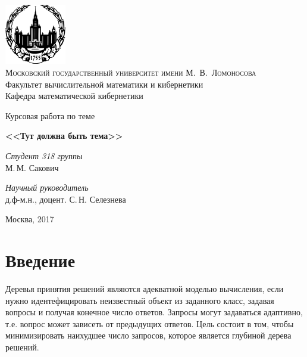 \documentclass[oneside, final, 12pt]{extreport}
\begin{document}
	\renewcommand\contentsname{Содержание} %
	\thispagestyle{empty}
	
	\begin{center}
		\ \vspace{-1cm}
		
		\includegraphics[width=0.2\textwidth]{logo-mgu.png}\\
		{\scshape Московский государственный университет имени М.~В.~Ломоносова}\\
		Факультет вычислительной математики и кибернетики\\
		Кафедра математической кибернетики
		
		\vfill
		
		{\LARGE Курсовая работа по теме}
		
		\vspace{1cm}
		
		{\Huge\bfseries <<Тут должна быть тема>>}
	\end{center}
	
	\vspace{1cm}
	
	\begin{flushright}
		\large
		\textit{Студент 318 группы}\\
		М.\,М. Сакович
		
		\vspace{5mm}
		
		\textit{Научный руководитель}\\
		д.ф-м.н., доцент. С.\,Н. Селезнева
	\end{flushright}
	
	\vfill
	
	\begin{center}
		Москва, 2017
	\end{center}

	\tableofcontents
	\chapter*{Введение}
	Деревья принятия решений являются адекватной моделью вычисления, если нужно идентефицировать неизвестный объект из заданного 
	класс, задавая вопросы и получая конечное число ответов. Запросы могут задаваться адаптивно, т.е. вопрос может зависеть от предыдущих 
	ответов. Цель состоит в том, чтобы минимизировать наихудшее число запросов, которое является глубиной дерева решений.
	
\end{document}
